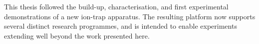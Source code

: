 \begin{center}
\end{center}

This thesis followed the build-up, characterisation, and first experimental
demonstrations of a new ion-trap apparatus. The resulting platform now supports 
several distinct research programmes, and is intended to enable experiments
extending well beyond the work presented here.
